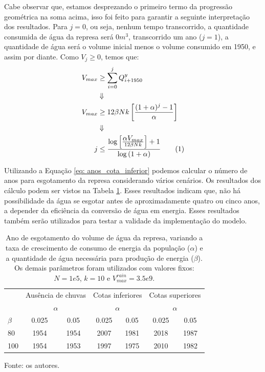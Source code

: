 \documentclass{article}
\newcommand\numberthis{\addtocounter{equation}{1}\tag{\theequation}}
\begin{document}
Cabe observar que, estamos desprezando o primeiro termo da progressão geométrica na soma acima, isso foi feito para garantir a seguinte interpretação dos resultados. Para $j = 0$, ou seja, nenhum tempo transcorrido, a quantidade consumida de água da represa será $0 m^3$, transcorrido um ano ($j = 1$), a quantidade de água será o volume inicial menos o volume consumido em 1950, e assim por diante. Como $V_j \geq 0$, temos que:
\begin{align*}
    V_{max} &\geq \sum_{i=0}^{j} Q_{i + 1950}^y \\
    &\Downarrow\\ 
    V_{max} &\geq 12\beta Nk \left[ \frac{(1 + \alpha)^{j} - 1}{\alpha}\right] \\
    &\Downarrow \\
    j &\leq \frac{\log{\left[ \frac{\displaystyle \alpha V_{max}}{12\beta Nk}\right]} + 1}{\displaystyle \log{(1 + \alpha)}} \numberthis \label{eq: anos_cota_inferior}
\end{align*}

Utilizando a Equação \ref{eq: anos_cota_inferior} podemos calcular o número de anos para esgotamento da represa considerando vários cenários. Os resultados dos cálculo podem ser vistos na Tabela \ref{tab:cotas_ano_esgotamento}. Esses resultados indicam que, não há possibilidade da água se esgotar antes de aproximadamente quatro ou cinco anos, a depender da eficiência da conversão de água em energia. Esses resultados também serão utilizados para testar a validade da implementação do modelo. 

\begin{table}[ht!]
    \centering
    \caption{Ano de esgotamento do volume de água da represa, variando a taxa de crescimento de consumo de energia da população ($\alpha$) e a quantidade de água necessária para produção de energia ($\beta$). Os demais parâmetros foram utilizados com valores fixos: $N = 1e5$, $k = 10$ e $V_{max}^{rain} = 3.5e9$.}
    \label{tab:cotas_ano_esgotamento}
    \begin{tabular}{lcccccc}
        \hline
             & \multicolumn{2}{l}{Ausência de chuvas} & \multicolumn{2}{l}{Cotas inferiores} & \multicolumn{2}{l}{Cotas superiores} \\ \cline{2-7} 
             & \multicolumn{2}{c}{$\alpha$}              & \multicolumn{2}{c}{$\alpha$}            & \multicolumn{2}{c}{$\alpha$}            \\ \cline{2-7} 
        $\beta$ & 0.025               & 0.05               & 0.025              & 0.05              & 0.025              & 0.05           \\ \hline
        80      & 1954                & 1954               & 2007               & 1981              & 2018               & 1987            \\
        100     & 1954                & 1953               & 1997               & 1975              & 2010               & 1982            \\ \hline
    \end{tabular}
    {\flushleft Fonte: os autores. \par}
\end{table}
\end{document}

